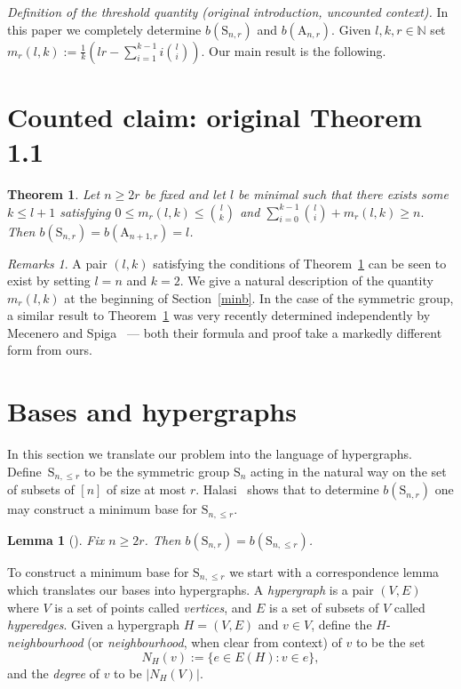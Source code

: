 \documentclass[10pt,a4paper]{amsart}
\renewcommand\S{\mathrm{S}}
\theoremstyle{plain}
\newtheorem{thm}[cdrthm]{Theorem}
\newtheorem{lemma}[cdrthm]{Lemma}
\theoremstyle{definition}
\theoremstyle{remark}
\newtheorem{remas}[cdrthm]{Remarks}
\begin{document}
\noindent\textit{Definition of the threshold quantity (original introduction, uncounted context).}
In this paper we completely determine $b(\S_{n,r})$ and $b(\mathrm{A}_{n,r})$. Given $l,k,r\in\mathbb{N}$ set $m_r(l,k):=\frac{1}{k}\left(lr-\sum_{i=1}^{k-1}i\binom{l}{i}\right)$. Our main result is the following.

\section*{Counted claim: original Theorem 1.1}
\begin{thm}\label{minbase}
Let $n\geq 2r$ be fixed and let $l$ be minimal such that there exists some $k\leq l+1$ satisfying $0\leq m_r(l,k)\leq\binom{l}{k}$ and $\sum_{i=0}^{k-1}\binom{l}{i}+m_r(l,k)\geq n.$ Then $b(\S_{n,r})=b(\mathrm{A}_{n+1,r})=l$.
\end{thm}

\begin{remas}
A pair $(l,k)$ satisfying the conditions of Theorem~\ref{minbase} can be seen to exist by setting $l=n$ and $k=2$. We give a natural description of the quantity $m_r(l,k)$ at the beginning of Section~\ref{minb}. In the case of the symmetric group, a similar result to Theorem~\ref{minbase} was very recently determined independently by Mecenero and Spiga~\cite{MeSp} --- both their formula and proof take a markedly different form from ours.
\end{remas}

\section{Bases and hypergraphs}\label{mach}
In this section we translate our problem into the language of hypergraphs. Define~$\mathrm{S}_{n,\leq r}$ to be the symmetric group $\mathrm{S}_n$ acting in the natural way on the set of subsets of $[n]$ of size at most $r$. Halasi~\cite{hal} shows that to determine $b(\S_{n,r})$ one may construct a minimum base for $\mathrm{S}_{n,\leq r}$.

\begin{lemma}[\cite{hal}]\label{hallem}
Fix $n\geq 2r$. Then $b(\S_{n,r})=b(\S_{n,\leq r})$.
\end{lemma}

To construct a minimum base for $\S_{n,\leq r}$ we start with a correspondence lemma which translates our bases into hypergraphs. A \emph{hypergraph} is a pair $(V,E)$ where $V$ is a set of points called \emph{vertices}, and $E$ is a set of subsets of $V$ called \emph{hyperedges}. Given a hypergraph $H=(V,E)$ and $v\in V$, define the $H$-\emph{neighbourhood} (or \emph{neighbourhood}, when clear from context) of $v$ to be the set $$N_H(v):=\{e\in E(H) : v\in e\},$$ and the \emph{degree} of $v$ to be $|N_{H}(V)|$. 
\end{document}
